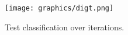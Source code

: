\documentclass{article}
\begin{document}
\begin{figure}[h]
	\centering
	\texttt{[image: graphics/digt.png]}
	\caption{Test classification over iterations.}
	\label{fig2}
\end{figure}



\end{document}
